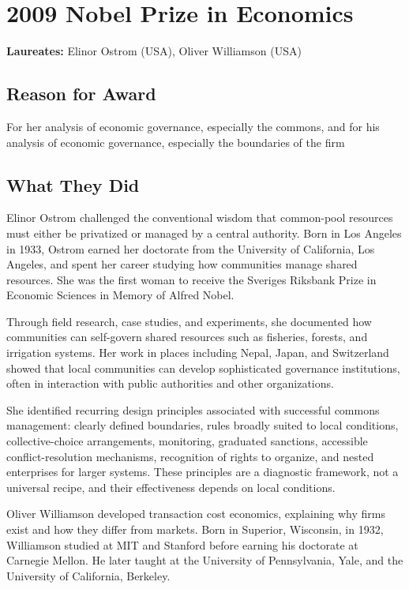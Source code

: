 \chapter{2009 Nobel Prize in Economics}
\textbf{Laureates: }Elinor Ostrom (USA), Oliver Williamson (USA)

\section*{Reason for Award}
For her analysis of economic governance, especially the commons, and for his
analysis of economic governance, especially the boundaries of the firm

\section{What They Did}
Elinor Ostrom challenged the conventional wisdom that common-pool resources must
either be privatized or managed by a central authority. Born in Los Angeles in
1933, Ostrom earned her doctorate from the University of California, Los Angeles,
and spent her career studying how communities manage shared resources. She was
the first woman to receive the Sveriges Riksbank Prize in Economic Sciences in
Memory of Alfred Nobel.

Through field research, case studies, and experiments, she documented how
communities can self-govern shared resources such as fisheries, forests, and
irrigation systems. Her work in places including Nepal, Japan, and Switzerland
showed that local communities can develop sophisticated governance institutions,
often in interaction with public authorities and other organizations.

She identified recurring design principles associated with successful commons
management: clearly defined boundaries, rules broadly suited to local conditions,
collective-choice arrangements, monitoring, graduated sanctions, accessible
conflict-resolution mechanisms, recognition of rights to organize, and nested
enterprises for larger systems. These principles are a diagnostic framework,
not a universal recipe, and their effectiveness depends on local conditions.

Oliver Williamson developed transaction cost economics, explaining why firms exist
and how they differ from markets. Born in Superior, Wisconsin, in 1932, Williamson
studied at MIT and Stanford before earning his doctorate at Carnegie Mellon. He
later taught at the University of Pennsylvania, Yale, and the University of
California, Berkeley.

